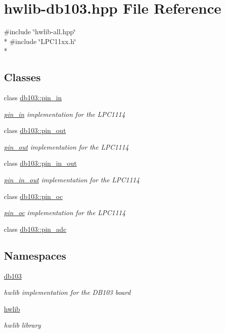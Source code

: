 \hypertarget{hwlib-db103_8hpp}{}\section{hwlib-\/db103.hpp File Reference}
\label{hwlib-db103_8hpp}
{\ttfamily \#include \char`\"{}hwlib-\/all.\+hpp\char`\"{}}\\*
{\ttfamily \#include \char`\"{}L\+P\+C11xx.\+h\char`\"{}}\\*
\subsection*{Classes}
\begin{DoxyCompactItemize}
\item 
class \hyperlink{classdb103_1_1pin__in}{db103\+::pin\+\_\+in}
\begin{DoxyCompactList}\small\item\em \hyperlink{classdb103_1_1pin__in}{pin\+\_\+in} implementation for the L\+P\+C1114 \end{DoxyCompactList}\item 
class \hyperlink{classdb103_1_1pin__out}{db103\+::pin\+\_\+out}
\begin{DoxyCompactList}\small\item\em \hyperlink{classdb103_1_1pin__out}{pin\+\_\+out} implementation for the L\+P\+C1114 \end{DoxyCompactList}\item 
class \hyperlink{classdb103_1_1pin__in__out}{db103\+::pin\+\_\+in\+\_\+out}
\begin{DoxyCompactList}\small\item\em \hyperlink{classdb103_1_1pin__in__out}{pin\+\_\+in\+\_\+out} implementation for the L\+P\+C1114 \end{DoxyCompactList}\item 
class \hyperlink{classdb103_1_1pin__oc}{db103\+::pin\+\_\+oc}
\begin{DoxyCompactList}\small\item\em \hyperlink{classdb103_1_1pin__oc}{pin\+\_\+oc} implementation for the L\+P\+C1114 \end{DoxyCompactList}\item 
class \hyperlink{classdb103_1_1pin__adc}{db103\+::pin\+\_\+adc}
\end{DoxyCompactItemize}
\subsection*{Namespaces}
\begin{DoxyCompactItemize}
\item 
 \hyperlink{namespacedb103}{db103}
\begin{DoxyCompactList}\small\item\em hwlib implementation for the D\+B103 board \end{DoxyCompactList}\item 
 \hyperlink{namespacehwlib}{hwlib}
\begin{DoxyCompactList}\small\item\em hwlib library \end{DoxyCompactList}\end{DoxyCompactItemize}
